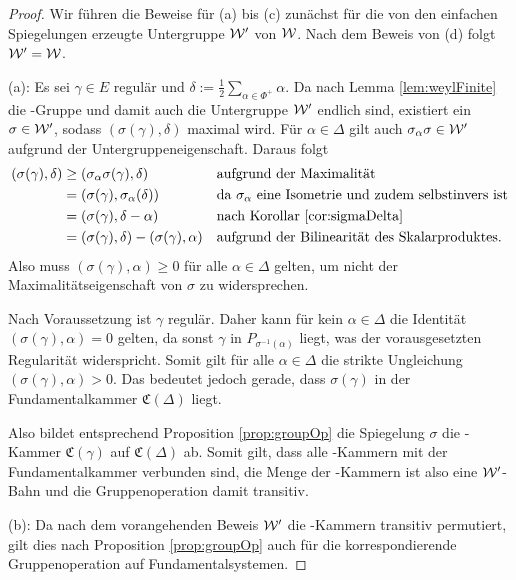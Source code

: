 \begin{proof}
  Wir führen die Beweise für (a) bis (c) zunächst für die von den einfachen Spiegelungen erzeugte Untergruppe $\mathcal{W}'$ von $\mathcal{W}$.
  Nach dem Beweis von (d) folgt $\mathcal{W}' = \mathcal{W}$.

  (a):
  Es sei $\gamma \in E$ regulär und $\delta := \tfrac{1}{2} \sum_{\alpha \in \Phi^+} \alpha$.
  Da nach Lemma \ref{lem:weylFinite} die \weyl\hyp{}Gruppe und damit auch die Untergruppe $\mathcal{W}'$ endlich sind, existiert ein $\sigma \in \mathcal{W}'$, sodass $(\sigma(\gamma), \delta)$ maximal wird.
  Für $\alpha \in \Delta$ gilt auch $\sigma_\alpha\sigma \in \mathcal{W}'$ aufgrund der Untergruppeneigenschaft.
  Daraus folgt
  \begin{align*}
    (\sigma(\gamma), \delta) 
    &\geq (\sigma_\alpha \sigma(\gamma), \delta) &&\text{aufgrund der Maximalität} \\
    &= (\sigma(\gamma), \sigma_\alpha(\delta)) &&\text{da $\sigma_\alpha$ eine Isometrie und zudem selbstinvers ist} \\
    &= (\sigma(\gamma), \delta - \alpha) &&\text{nach Korollar \ref{cor:sigmaDelta}} \\
    &= (\sigma(\gamma), \delta) - (\sigma(\gamma), \alpha) &&\text{aufgrund der Bilinearität des Skalarproduktes.}
  \end{align*}
  Also muss $(\sigma(\gamma), \alpha) \geq 0$ für alle $\alpha \in \Delta$ gelten, um nicht der Maximalitätseigenschaft von $\sigma$ zu widersprechen.

  Nach Voraussetzung ist $\gamma$ regulär.
  Daher kann für kein $\alpha \in \Delta$ die Identität $(\sigma(\gamma),\alpha) = 0$ gelten, da sonst $\gamma$ in $P_{\sigma^{-1}(\alpha)}$ liegt, was der vorausgesetzten Regularität widerspricht.
  Somit gilt für alle $\alpha \in \Delta$ die strikte Ungleichung $(\sigma(\gamma), \alpha) > 0$.
  Das bedeutet jedoch gerade, dass $\sigma(\gamma)$ in der Fundamentalkammer $\mathfrak{C}(\Delta)$ liegt.

  Also bildet entsprechend Proposition \ref{prop:groupOp} die Spiegelung $\sigma$ die \weyl\hyp{}Kammer $\mathfrak{C}(\gamma)$ auf $\mathfrak{C}(\Delta)$ ab. 
  Somit gilt, dass alle \weyl\hyp{}Kammern mit der Fundamentalkammer verbunden sind, die Menge der \weyl\hyp{}Kammern ist also eine $\mathcal{W}'$\hyp{}Bahn und die Gruppenoperation damit transitiv.


  (b):
  Da nach dem vorangehenden Beweis $\mathcal{W}'$ die \weyl\hyp{}Kammern transitiv permutiert, gilt dies nach Proposition \ref{prop:groupOp} auch für die korrespondierende Gruppenoperation auf Fundamentalsystemen.


\end{proof}
